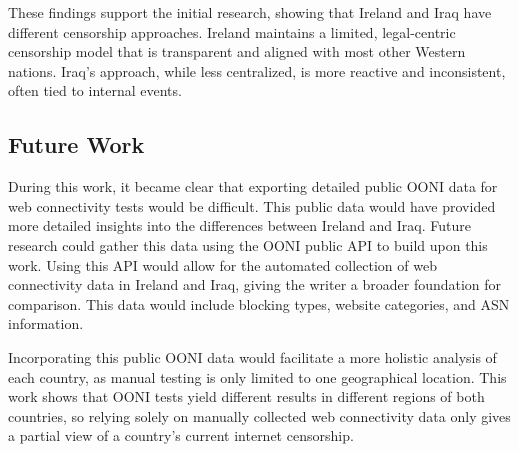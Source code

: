 These findings support the initial research, showing that Ireland and Iraq have different censorship approaches. Ireland maintains a limited, legal-centric censorship model that is transparent and aligned with most other Western nations. Iraq's approach, while less centralized, is more reactive and inconsistent, often tied to internal events. 

\subsection{Future Work}

During this work, it became clear that exporting detailed public OONI data for web connectivity tests would be difficult. This public data would have provided more detailed insights into the differences between Ireland and Iraq. Future research could gather this data using the OONI public API to build upon this work. Using this API would allow for the automated collection of web connectivity data in Ireland and Iraq, giving the writer a broader foundation for comparison. This data would include blocking types, website categories, and ASN information.

Incorporating this public OONI data would facilitate a more holistic analysis of each country, as manual testing is only limited to one geographical location. This work shows that OONI tests yield different results in different regions of both countries, so relying solely on manually collected web connectivity data only gives a partial view of a country's current internet censorship. 
